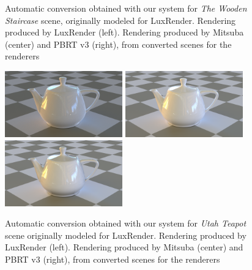 \begin{figure}
\caption{Automatic conversion obtained with our system for \textit{The Wooden Staircase}
scene, originally modeled for LuxRender. Rendering produced by LuxRender (left).
Rendering produced by Mitsuba (center) and PBRT v3 (right),
from converted scenes for the renderers}
\label{fig:staircase}
\end{figure}

\begin{figure}
\centering
\includegraphics[width=2in]{figs/4_results/teapot/1_from_lux.png}
\includegraphics[width=2in]{figs/4_results/teapot/2_to_mitsuba.png}
\includegraphics[width=2in]{figs/4_results/teapot/3_to_pbrt.png}
\caption{Automatic conversion obtained with our system for \textit{Utah Teapot}
scene originally modeled for LuxRender. Rendering produced by LuxRender (left).
Rendering produced by Mitsuba (center) and PBRT v3 (right),
from converted scenes for the renderers}
\label{fig:teapot}
\end{figure}

